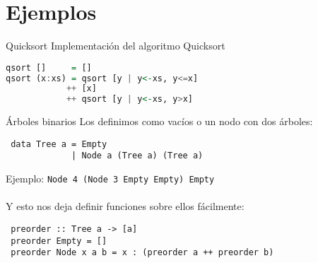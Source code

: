 \section{Ejemplos}

\begin{frame}[fragile]{Quicksort}
  Implementación del algoritmo Quicksort
  \begin{lstlisting}[language=haskell]
qsort []     = []
qsort (x:xs) = qsort [y | y<-xs, y<=x]
            ++ [x]
            ++ qsort [y | y<-xs, y>x]
  \end{lstlisting}
\end{frame}

\begin{frame}[fragile]{Árboles binarios}
  Los definimos como vacíos o un nodo con dos árboles:
  \begin{lstlisting}
 data Tree a = Empty
             | Node a (Tree a) (Tree a)
  \end{lstlisting}
  Ejemplo: \texttt{Node 4 (Node 3 Empty Empty) Empty}
  \\~\\
  Y esto nos deja definir funciones sobre ellos fácilmente:
  \begin{lstlisting}
 preorder :: Tree a -> [a]
 preorder Empty = []
 preorder Node x a b = x : (preorder a ++ preorder b)  
  \end{lstlisting}  
\end{frame}
